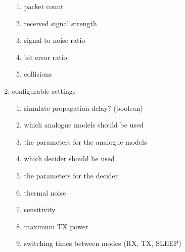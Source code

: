 \begin{enumerate}
\begin{enumerate}
	\item packet count \label{statPackets}
	\item received signal strength \label{statRSS}
	\item signal to noise ratio \label{statSNR}
	\item bit error ratio \label{statBER}
	\item collisions \label{statColls}
	\end{enumerate}
 \item configurable settings
	\begin{enumerate}
	\item simulate propagation delay? (boolean) \label{confDelay}
	\item which analogue models should be used \label{confAnalogue}
	\item the parameters for the analogue models \label{confAnalogueParam}
	\item which decider should be used \label{confDecider}
	\item the parameters for the decider \label{confDeciderParam}
	\item thermal noise \label{confNoise}
	\item sensitivity \label{confSens}
	\item maximum TX power \label{confMaxTXPower}
	\item switching times between modes (RX, TX, SLEEP) \label{confSwitchingTimes}
	\end{enumerate}
\end{enumerate}


